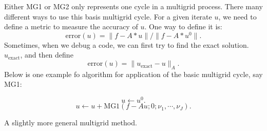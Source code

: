 Either MG1 or MG2 only represents one cycle in a multigrid process. There many  different ways
to use this basis multigrid cycle. For a given iterate $u$, we need to define a metric to measure the
accuracy of $u$. One way to define it is:
$$
\text{error}(u) = \|f - A\ast u\|  \big/ \|f - A\ast u^0\|.
$$
Sometimes, when we debug a code, we can first try to find the exact solution. $u_{\text{exact}}$, and
then define 
$$
\text{error}(u) = \| u_{\text{exact}} - u\|_A.
$$
Below is one example fo algorithm for application of the basic multigrid cycle, say MG1:
\begin{breakablealgorithm}%
	\caption{$u = {\text{multigrid1}}(f; u^0; J,\nu_1, \cdots, \nu_J;  \text{tol})$;}
	\label{alg:multigrid-1}
	\begin{algorithmic}
		\State 
		$$
		u \leftarrow u^0.
		$$
		\State
		$$
		u \leftarrow u + \text{MG1}(f-Au;0;\nu_1, \cdots, \nu_J).
		$$
		\EndWhile
	\end{algorithmic}
\end{breakablealgorithm}

A slightly more general multigrid method. 

